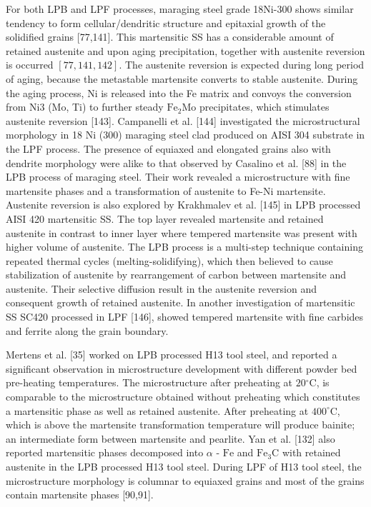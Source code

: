 \documentclass[10pt]{article}
\begin{document}
For both LPB and LPF processes, maraging steel grade 18Ni-300 shows similar tendency to form cellular/dendritic structure and epitaxial growth of the solidified grains [77,141]. This martensitic SS has a considerable amount of retained austenite and upon aging precipitation, together with austenite reversion is occurred $[77,141,142]$. The austenite reversion is expected during long period of aging, because the metastable martensite converts to stable austenite. During the aging process, $\mathrm{Ni}$ is released into the Fe matrix and convoys the conversion from $\mathrm{Ni} 3$ (Mo, Ti) to further steady $\mathrm{Fe}_{2} \mathrm{Mo}$ precipitates, which stimulates austenite reversion [143]. Campanelli et al. [144] investigated the microstructural morphology in 18 Ni (300) maraging steel clad produced on AISI 304 substrate in the LPF process. The presence of equiaxed and elongated grains also with dendrite morphology were alike to that observed by Casalino et al. [88] in the LPB process of maraging steel. Their work revealed a microstructure with fine martensite phases and a transformation of austenite to Fe-Ni martensite. Austenite reversion is also explored by Krakhmalev et al. [145] in LPB processed AISI 420 martensitic SS. The top layer revealed martensite and retained austenite in contrast to inner layer where tempered martensite was present with higher volume of austenite. The LPB process is a multi-step technique containing repeated thermal cycles (melting-solidifying), which then believed to cause stabilization of austenite by rearrangement of carbon between martensite and austenite. Their selective diffusion result in the austenite reversion and consequent growth of retained austenite. In another investigation of martensitic SS SC420 processed in LPF [146], showed tempered martensite with fine carbides and ferrite along the grain boundary.

Mertens et al. [35] worked on LPB processed H13 tool steel, and reported a significant observation in microstructure development with different powder bed pre-heating temperatures. The microstructure after preheating at $20{ }^{\circ} \mathrm{C}$, is comparable to the microstructure obtained without preheating which constitutes a martensitic phase as well as retained austenite. After preheating at $400^{\circ} \mathrm{C}$, which is above the martensite transformation temperature will produce bainite; an intermediate form between martensite and pearlite. Yan et al. [132] also reported martensitic phases decomposed into $\alpha$ - $\mathrm{Fe}$ and $\mathrm{Fe}_{3} \mathrm{C}$ with retained austenite in the LPB processed H13 tool steel. During LPF of H13 tool steel, the microstructure morphology is columnar to equiaxed grains and most of the grains contain martensite phases [90,91].
\end{document}
